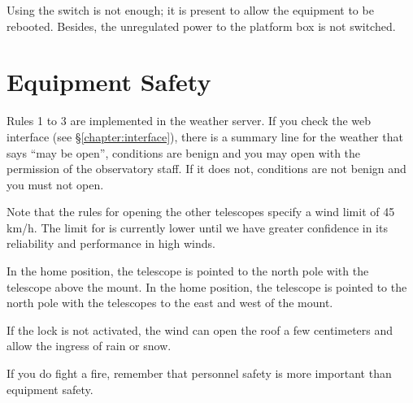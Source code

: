 Using the switch is not enough; it is present to allow the equipment to be rebooted. Besides, the unregulated power to the platform box is not switched.



\section{Equipment Safety}


Rules 1 to 3 are implemented in the {\projectname} weather server. If you check the {\projectname} web interface (see \S\ref{chapter:interface}), there is a summary line for the weather that says “may be open”, conditions are benign and you may open with the permission of the observatory staff. If it does not, conditions are not benign and you must not open.

Note that the rules for opening the other telescopes specify a wind limit of 45 km/h. The limit for {\projectname} is currently lower until we have greater confidence in its reliability and performance in high winds.


\ifcoatli
In the home position, the telescope is pointed to the north pole with the telescope above the mount.
\fi
\ifddoti
In the home position, the telescope is pointed to the north pole with the telescopes to the east and west of the mount.
\fi



If the lock is not activated, the wind can open the roof a few centimeters and allow the ingress of rain or snow.


If you do fight a fire, remember that personnel safety is more important than equipment safety.

